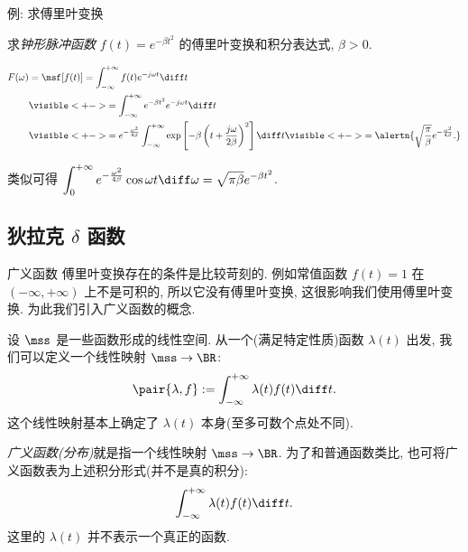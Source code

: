 \begin{frame}{例: 求傅里叶变换}
	\onslide<+->
	\begin{example}
		求\emph{钟形脉冲函数} $f(t)=e^{-\beta t^2}$ 的傅里叶变换和积分表达式, $\beta>0$.
	\end{example}

	\onslide<+->
	\begin{solution}
		\vspace{-\baselineskip}
		\begin{align*}
			F(\omega)&=\msf[f(t)]=\int_{-\infty}^{+\infty}f(t)e^{-j\omega t}\diff t\\
			&\visible<+->{=\int_{-\infty}^{+\infty}e^{-\beta t^2}e^{-j\omega t}\diff t}\\
			&\visible<+->{=e^{-\frac{\omega^2}{4\beta}}\int_{-\infty}^{+\infty}\exp\left[-\beta\left(t+\frac{j\omega}{2\beta}\right)^2\right]\diff t}
			\visible<+->{=\alertn{\sqrt{\frac\pi\beta}e^{-\frac{\omega^2}{4\beta}}.}}
		\end{align*}
	\end{solution}

	\onslide<+->
	类似可得
	$\displaystyle\int_0^{+\infty}e^{-\frac{\omega^2}{4\beta}}\cos\omega t\diff\omega=\sqrt{\pi\beta}e^{-\beta t^2}$.
\end{frame}


\subsection{狄拉克 \texorpdfstring{$\delta$}{δ} 函数}

\begin{frame}{广义函数}
	\onslide<+->
	傅里叶变换存在的条件是比较苛刻的.
	\onslide<+->
	例如常值函数 $f(t)=1$ 在 $(-\infty,+\infty)$ 上不是可积的, 所以它没有傅里叶变换, 这很影响我们使用傅里叶变换.
	\onslide<+->
	为此我们引入广义函数的概念.

	\onslide<+->
	设 $\mss$ 是一些函数形成的线性空间.
	\onslide<+->
	从一个(满足特定性质)函数 $\lambda(t)$ 出发, 我们可以定义一个线性映射 $\mss\to \BR$:
	\[\pair{\lambda,f}:=\int_{-\infty}^{+\infty}\lambda(t)f(t)\diff t.\]
	\onslide<+->
	这个线性映射基本上确定了 $\lambda(t)$ 本身(至多可数个点处不同).

	\onslide<+->
	\emph{广义函数(分布)}就是指一个线性映射 $\mss\to \BR$.
	\onslide<+->
	为了和普通函数类比, 也可将广义函数表为上述积分形式(并不是真的积分):
	\[\int_{-\infty}^{+\infty}\lambda(t)f(t)\diff t.\]
	这里的 $\lambda(t)$ 并不表示一个真正的函数.
\end{frame}


